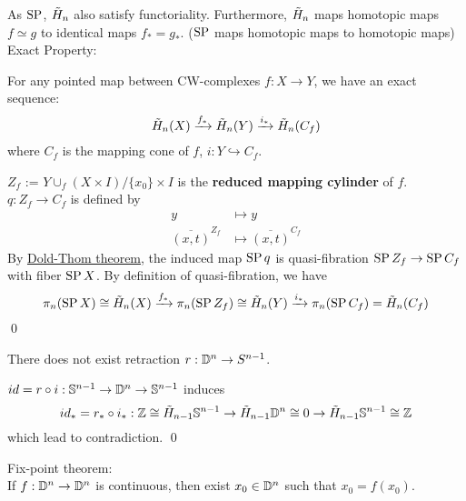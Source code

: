     As $\operatorname{SP}$, $\tilde{H}_n$ also satisfy functoriality.
    Furthermore, $\tilde{H}_n$ maps homotopic maps $f \simeq g$ to identical maps $f_* = g_*$.
    ($\operatorname{SP}$ maps homotopic maps to homotopic maps)\\

    Exact Property:
    \begin{prop}
        For any pointed map between CW-complexes $f : X \to Y$,
        we have an exact sequence:
        $$
        \tilde{H}_n(X) \xrightarrow{f_*} \tilde{H}_n(Y) \xrightarrow{i_*} \tilde{H}_n(C_f)
        $$
        where $C_f$ is the mapping cone of $f$, $i : Y \hookrightarrow C_f$.
    \end{prop}

    \begin{prf}
        $Z_f$ := $Y \cup_f (X \times I) / \{ x_0 \} \times I$ is the \textbf{reduced mapping cylinder}
        of $f$.\\
        $q : Z_f \to C_f $ is defined by
        \begin{align*}
            y & \mapsto y\\
            \overline{(x,t)}^{Z_f} & \mapsto \overline{(x,t)}^{C_f}
        \end{align*}
        By \hyperref[hyp:Dold-Thom]{Dold-Thom theorem},
        the induced map $\operatorname{SP} q$ is quasi-fibration $\operatorname{SP} Z_f \to \operatorname{SP} C_f $ with fiber $\operatorname{SP} X$.
        By definition of quasi-fibration, we have
        $$
        \pi_n(\operatorname{SP} X) \cong \tilde{H}_n(X) \xrightarrow{f_*} \pi_n(\operatorname{SP} Z_f) \cong \tilde{H}_n(Y) \xrightarrow{i_*} \pi_n(\operatorname{SP} C_f) = \tilde{H}_n(C_f)
        $$
        \qed
    \end{prf}

    \begin{prop}
        \label{hyp:Sn-is-not-retract-of-Dn+1} There does not exist retraction $r : \mathbb D^n \to S^{n-1} $.
    \end{prop}

    \begin{prf}
        $id = r \circ i : \mathbb S^{n-1} \to \mathbb D^n \to \mathbb S^{n-1}$
        induces
        $$
        id_* = r_* \circ i_* : \mathbb Z \cong \tilde{H}_{n-1}\mathbb S^{n-1} \to \tilde{H}_{n-1}\mathbb D^n  \cong 0 \to \tilde{H}_{n-1}\mathbb S^{n-1} \cong \mathbb Z
        $$
        which lead to contradiction.
        \qed
    \end{prf}

    \begin{thm}
        Fix-point theorem:\\
        If $f : \mathbb D^n \to \mathbb D^n$ is continuous,
        then exist $x_0 \in \mathbb D^n$ such that
        $x_0 = f(x_0)$.
    \end{thm}

